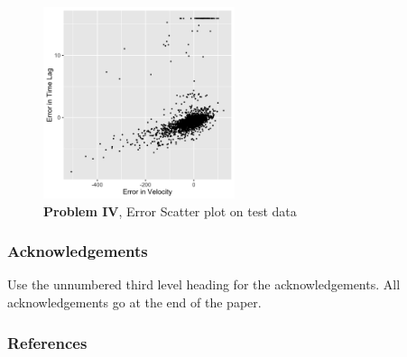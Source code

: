 \documentclass[twoside]{article}
\begin{document}
\begin{figure}[h]
\vspace{.3in}
\centerline{\includegraphics[width=0.5\textwidth]{figures/exp4_scatter_errors_test.png}}
\vspace{.3in}
\caption{\textbf{Problem IV}, Error Scatter plot on test data}
\end{figure}

\subsubsection*{Acknowledgements}

Use the unnumbered third level heading for the acknowledgements.  All
acknowledgements go at the end of the paper.

\subsubsection*{References}


\end{document}
